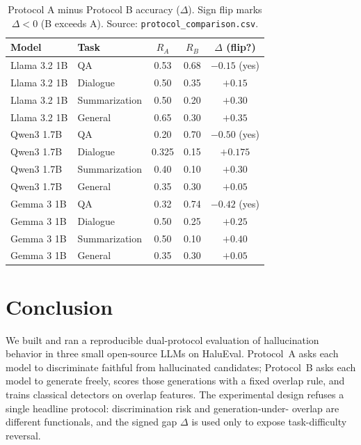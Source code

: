 \documentclass[11pt]{article}
\begin{document}
\begin{table}[t]
\centering
\caption{Protocol A minus Protocol B accuracy ($\Delta$). Sign flip marks $\Delta<0$ (B exceeds A). Source: \texttt{protocol\_comparison.csv}.}
\label{tab:delta}
\begin{tabular}{llccc}
\toprule
Model & Task & $R_A$ & $R_B$ & $\Delta$ (flip?) \\
\midrule
Llama 3.2 1B & QA & 0.53 & 0.68 & $-0.15$ (yes) \\
Llama 3.2 1B & Dialogue & 0.50 & 0.35 & $+0.15$ \\
Llama 3.2 1B & Summarization & 0.50 & 0.20 & $+0.30$ \\
Llama 3.2 1B & General & 0.65 & 0.30 & $+0.35$ \\
Qwen3 1.7B & QA & 0.20 & 0.70 & $-0.50$ (yes) \\
Qwen3 1.7B & Dialogue & 0.325 & 0.15 & $+0.175$ \\
Qwen3 1.7B & Summarization & 0.40 & 0.10 & $+0.30$ \\
Qwen3 1.7B & General & 0.35 & 0.30 & $+0.05$ \\
Gemma 3 1B & QA & 0.32 & 0.74 & $-0.42$ (yes) \\
Gemma 3 1B & Dialogue & 0.50 & 0.25 & $+0.25$ \\
Gemma 3 1B & Summarization & 0.50 & 0.10 & $+0.40$ \\
Gemma 3 1B & General & 0.35 & 0.30 & $+0.05$ \\
\bottomrule
\end{tabular}
\end{table}

\section{Conclusion}

We built and ran a reproducible dual-protocol evaluation of hallucination
behavior in three small open-source LLMs on HaluEval. Protocol~A asks each model
to discriminate faithful from hallucinated candidates; Protocol~B asks each
model to generate freely, scores those generations with a fixed overlap rule,
and trains classical detectors on overlap features. The experimental design
refuses a single headline protocol: discrimination risk and generation-under-
overlap are different functionals, and the signed gap $\Delta$ is used only to
expose task-difficulty reversal.
\end{document}
